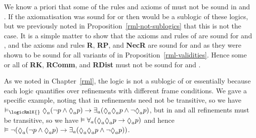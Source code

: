 We know a priori that some of the rules and axioms of \axiomRmlK{} must not be sound in \logicRmlKFF{} and \logicRmlKD{}.
If the axiomatisation \axiomRmlK{} was sound for \logicRmlKFF{} or \logicRmlKD{} then \logicRmlK{} would be a sublogic of these logics, but we previously noted in Proposition~\ref{rml-not-sublogics} that this is not the case.
It is a simple matter to show that the axioms and rules of \axiomK{} are sound for \logicRmlKFF{} and \logicRmlKD{}, and the axioms and rules {\bf R}, {\bf RP}, and {\bf NecR} are sound for \logicRmlKFF{} and \logicRmlKD{} as they were shown to be sound for all variants of \logicRml{} in Proposition~\ref{rml-validities}.
Hence some or all of {\bf RK}, {\bf RComm}, and {\bf RDist} must not be sound for \logicRmlKFF{} and \logicRmlKD{}. 

As we noted in Chapter~\ref{rml}, the logic \logicRmlK{} is not a sublogic of \logicRmlKFF{} or \logicRmlKD{} essentially because each logic quantifies over refinements with different frame conditions.
We gave a specific example, noting that in \logicRmlK{} refinements need not be transitive, so we have $\entails_\logicRmlK{} \possibleA (\lnot \atomP \land \possibleA \atomP) \implies \somerefsA (\possibleA \possibleA \atomP \land \lnot \possibleA \atomP)$, but in \logicRmlKFF{} and \logicRmlKD{} all refinements must be transitive, so we have $\entails \allrefsA (\possibleA \possibleA \atomP \implies \possibleA \atomP)$ and hence $
\entails \lnot (\possibleA (\lnot \atomP \land \possibleA \atomP) \implies \somerefsA (\possibleA \possibleA \atomP \land \lnot \possibleA \atomP))$.

\pagebreak

